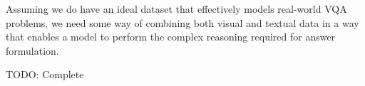 Assuming we do have an ideal dataset that effectively models real-world VQA problems, we need some way of combining both visual and textual data in a way that enables a model to perform the complex reasoning required for answer formulation.

{\color{red} TODO: Complete}





